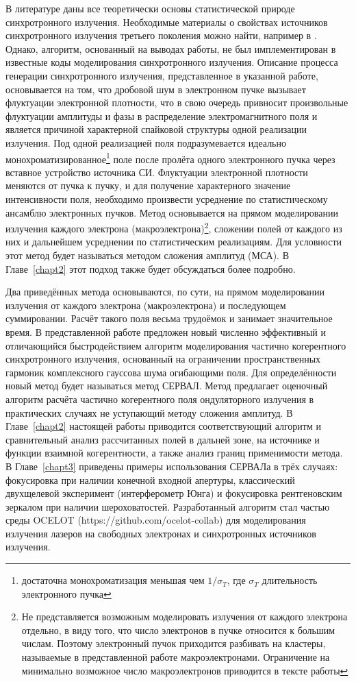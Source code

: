 В литературе даны все теоретически основы статистической природе синхротронного излучения. Необходимые материалы о свойствах источников синхротронного излучения третьего поколения можно найти, например в \cite{geloni_transverse_2008}. Однако, алгоритм, основанный на выводах работы, не был имплементирован в известные коды  моделирования синхротронного излучения. Описание процесса генерации синхротронного излучения, представленное в указанной работе, основывается на том, что дробовой шум в электронном пучке вызывает флуктуации электронной плотности, что в свою очередь привносит произвольные флуктуации амплитуды и фазы в распределение электромагнитного поля и является причиной характерной спайковой структуры одной реализации излучения. Под одной реализацией поля подразумевается идеально монохроматизированное\footnote{достаточна монохроматизация меньшая чем $1/\sigma_{T}$, где $\sigma_{T}$ длительность электронного пучка} поле после пролёта одного электронного пучка через вставное устройство источника СИ. Флуктуации электронной плотности меняются от пучка к пучку, и для получение характерного значение интенсивности поля, необходимо произвести усреднение по статистическому ансамблю электронных пучков. Метод основывается на прямом моделировании излучения каждого электрона (макроэлектрона)\footnote{Не представляется возможным моделировать излучения от каждого электрона отдельно, в виду того, что число электронов в пучке относится к большим числам. Поэтому электронный пучок приходится разбивать на кластеры, называемые в представленной работе макроэлектронами. Ограничение на минимально возможное число макроэлектронов приводится в тексте работы}, сложении полей от каждого из них и дальнейшем усреднении по статистическим реализациям. Для условности этот метод будет называться методом сложения амплитуд (МСА). В Главе~\ref{chapt2} этот подход также будет обсуждаться более подробно.

Два приведённых метода основываются, по сути, на прямом моделировании излучения от каждого электрона (макроэлектрона) и последующем суммировании. Расчёт такого поля весьма трудоёмок и занимает значительное время. В представленной работе предложен новый численно эффективный и отличающийся быстродействием алгоритм моделирования частично когерентного синхротронного излучения, основанный на ограничении пространственных гармоник комплексного гауссова шума огибающими поля. Для определённости новый метод будет называться метод СЕРВАЛ. Метод предлагает оценочный алгоритм расчёта частично когерентного поля ондуляторного излучения в практических случаях не уступающий методу сложения амплитуд. В Главе~\ref{chapt2} настоящей работы приводится соответствующий алгоритм и сравнительный анализ рассчитанных полей в дальней зоне, на источнике и функции взаимной когерентности, а также анализ границ применимости метода. В Главе~\ref{chapt3} приведены примеры использования СЕРВАЛа в трёх случаях: фокусировка при наличии конечной входной апертуры, классический двухщелевой эксперимент (интерферометр Юнга) и фокусировка рентгеновским зеркалом при наличии шероховатостей. Разработанный алгоритм стал частью среды OCELOT (https://github.com/ocelot-collab) для моделирования излучения лазеров на свободных электронах и синхротронных источников излучения. 

